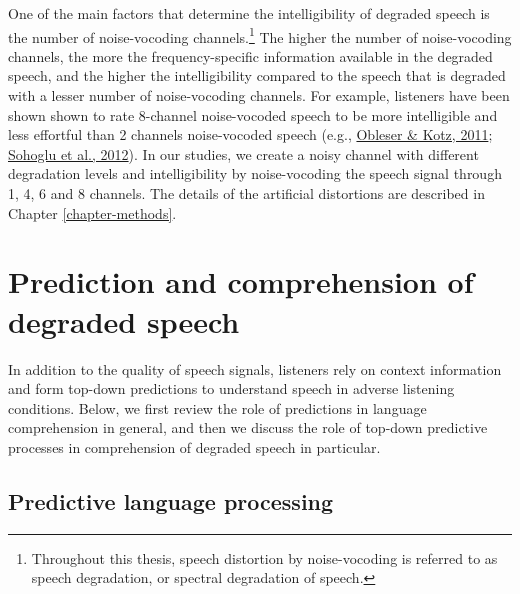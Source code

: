 \documentclass[a4paper, nobind]{templates/ociamthesis}
\begin{document}
One of the main factors that determine the intelligibility of degraded speech is the number of noise-vocoding channels.\footnote{Throughout this thesis, speech distortion by noise-vocoding is referred to as speech degradation, or spectral degradation of speech.}
The higher the number of noise-vocoding channels, the more the frequency-specific information available in the degraded speech,
and the higher the intelligibility compared to the speech that is degraded with a lesser number of noise-vocoding channels.
For example, listeners have been shown shown to rate 8-channel noise-vocoded speech to be more intelligible and less effortful than 2 channels noise-vocoded speech (e.g., \protect\hyperlink{ref-Obleser2011}{Obleser \& Kotz, 2011}; \protect\hyperlink{ref-Sohoglu2012}{Sohoglu et al., 2012}).
In our studies, we create a noisy channel with different degradation levels and intelligibility by noise-vocoding the speech signal through 1, 4, 6 and 8 channels.
The details of the artificial distortions are described in Chapter \ref{chapter-methods}.

\hypertarget{prediction-and-comprehension-of-degraded-speech}{%
\section{Prediction and comprehension of degraded speech}\label{prediction-and-comprehension-of-degraded-speech}}

In addition to the quality of speech signals, listeners rely on context information and form top-down predictions to understand speech in adverse listening conditions.
Below, we first review the role of predictions in language comprehension in general,
and then we discuss the role of top-down predictive processes in comprehension of degraded speech in particular.

\hypertarget{predictive-language-processing}{%
\subsection{Predictive language processing}\label{predictive-language-processing}}
\end{document}
